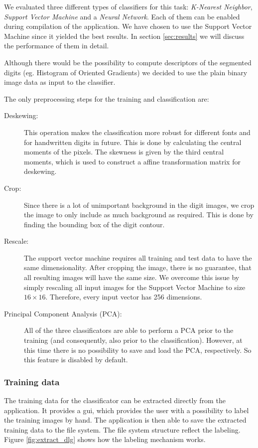 \documentclass[
a4paper,     %
12pt         %
]{scrartcl}  %
\begin{document}
We evaluated three different types of classifiers for this task: \emph{K-Nearest Neighbor},
\emph{Support Vector Machine} and a \emph{Neural Network}. Each of them can be enabled
during compilation of the application. We have chosen to use the Support Vector Machine
since it yielded the best results. In section \ref{sec:results} we will discuss the performance
of them in detail.

Although there would be the possibility to compute descriptors of the segmented digits
(eg. Histogram of Oriented Gradients) we decided to use the plain binary image data
as input to the classifier.

The only preprocessing steps for the training and classification are:

\begin{description}
  \item[Deskewing:] This operation makes the classification more robust for different
  fonts and for handwritten digits in future. This is done by calculating the central
  moments of the pixels. The skewness is given by the third central moments, which is
  used to construct a affine transformation matrix for deskewing.
  \item[Crop:] Since there is a lot of unimportant background in the digit images, we
  crop the image to only include as much background as required. This is done by finding
  the bounding box of the digit contour.
  \item[Rescale:] The support vector machine requires all training and test data to have
  the same dimensionality. After cropping the image, there is no guarantee, that all resulting
  images will have the same size. We overcome this issue by simply rescaling all input
  images for the Support Vector Machine to size $16 \times 16$. Therefore, every input
  vector has 256 dimensions.
  \item[Principal Component Analysis (PCA):] All of the three classificators are able to
  perform a PCA prior to the training (and consequently, also prior to the classification).
  However, at this time there is no possibility to save and load the PCA, respectively.
  So this feature is disabled by default. 
\end{description}

\subsubsection{Training data}

The training data for the classificator can be extracted directly from the application. It
provides a gui, which provides the user with a possibility to label the training images
by hand. The application is then able to save the extracted training data to the file system.
The file system structure reflect the labeling. Figure \ref{fig:extract_dlg} shows how the
labeling mechanism works.
\end{document}
